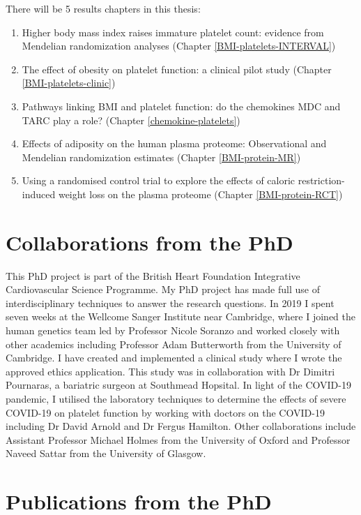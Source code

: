 \documentclass[11pt,twoside]{bristolthesis}
\providecommand{\tightlist}{%
  \setlength{\itemsep}{0pt}\setlength{\parskip}{0pt}}
\begin{document}
There will be 5 results chapters in this thesis:
\begin{enumerate}
\def\labelenumi{\arabic{enumi})}
\tightlist
\item
  Higher body mass index raises immature platelet count: evidence from Mendelian randomization analyses (Chapter \ref{BMI-platelets-INTERVAL})
\item
  The effect of obesity on platelet function: a clinical pilot study (Chapter \ref{BMI-platelets-clinic})
\item
  Pathways linking BMI and platelet function: do the chemokines MDC and TARC play a role? (Chapter \ref{chemokine-platelets})
\item
  Effects of adiposity on the human plasma proteome: Observational and Mendelian randomization estimates (Chapter \ref{BMI-protein-MR})
\item
  Using a randomised control trial to explore the effects of caloric restriction-induced weight loss on the plasma proteome (Chapter \ref{BMI-protein-RCT})
\end{enumerate}
\hypertarget{collaborations-from-the-phd}{%
\section{Collaborations from the PhD}\label{collaborations-from-the-phd}}

This PhD project is part of the British Heart Foundation Integrative Cardiovascular Science Programme. My PhD project has made full use of interdisciplinary techniques to answer the research questions. In 2019 I spent seven weeks at the Wellcome Sanger Institute near Cambridge, where I joined the human genetics team led by Professor Nicole Soranzo and worked closely with other academics including Professor Adam Butterworth from the University of Cambridge. I have created and implemented a clinical study where I wrote the approved ethics application. This study was in collaboration with Dr Dimitri Pournaras, a bariatric surgeon at Southmead Hopsital. In light of the COVID-19 pandemic, I utilised the laboratory techniques to determine the effects of severe COVID-19 on platelet function by working with doctors on the COVID-19 including Dr David Arnold and Dr Fergus Hamilton. Other collaborations include Assistant Professor Michael Holmes from the University of Oxford and Professor Naveed Sattar from the University of Glasgow.

\hypertarget{publications-from-the-phd}{%
\section{Publications from the PhD}\label{publications-from-the-phd}}
\end{document}
